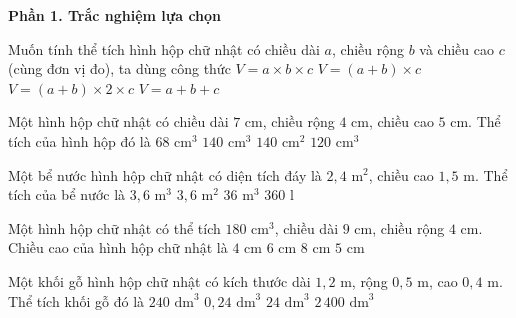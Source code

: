 \textbf{Phần 1. Trắc nghiệm lựa chọn}

\begin{ex} %
Muốn tính thể tích hình hộp chữ nhật có chiều dài $a$, chiều rộng $b$ và chiều cao $c$ (cùng đơn vị đo), ta dùng công thức
\choice
{\True $V = a \times b \times c$}
{$V = (a + b) \times c$}
{$V = (a + b) \times 2 \times c$}
{$V = a + b + c$}
\end{ex}

\begin{ex} %
Một hình hộp chữ nhật có chiều dài $7\text{ cm}$, chiều rộng $4\text{ cm}$, chiều cao $5\text{ cm}$. Thể tích của hình hộp đó là
\choice
{$68\text{ cm}^3$}
{\True $140\text{ cm}^3$}
{$140\text{ cm}^2$}
{$120\text{ cm}^3$}
\end{ex}

\begin{ex} %
Một bể nước hình hộp chữ nhật có diện tích đáy là $2{,}4\text{ m}^2$, chiều cao $1{,}5\text{ m}$. Thể tích của bể nước là
\choice
{\True $3{,}6\text{ m}^3$}
{$3{,}6\text{ m}^2$}
{$36\text{ m}^3$}
{$360\text{ l}$}
\end{ex}

\begin{ex} %
Một hình hộp chữ nhật có thể tích $180\text{ cm}^3$, chiều dài $9\text{ cm}$, chiều rộng $4\text{ cm}$. Chiều cao của hình hộp chữ nhật là
\choice
{$4\text{ cm}$}
{$6\text{ cm}$}
{$8\text{ cm}$}
{\True $5\text{ cm}$}
\end{ex}

\begin{ex} %
Một khối gỗ hình hộp chữ nhật có kích thước dài $1{,}2\text{ m}$, rộng $0{,}5\text{ m}$, cao $0{,}4\text{ m}$. Thể tích khối gỗ đó là
\choice
{\True $240\text{ dm}^3$}
{$0{,}24\text{ dm}^3$}
{$24\text{ dm}^3$}
{$2\,400\text{ dm}^3$}
\end{ex}

